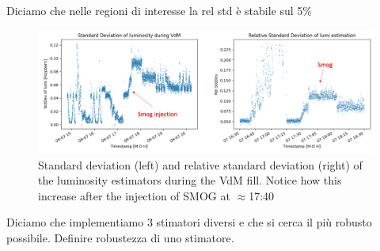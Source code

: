 Diciamo che nelle regioni di interesse la rel std è stabile sul 5\%


\begin{figure}
    \centering
    \includegraphics[width=\textwidth]{figures/std_dev_and_rel_std.png}
    \caption{Standard deviation (left) and relative standard deviation (right) of the luminosity estimators during the VdM fill. Notice how this increase after the injection of SMOG at $\approx$17:40}
    \label{fig:std_dev_rel_std}
\end{figure}


Diciamo che implementiamo 3 stimatori diversi e che si cerca il più robusto possibile. Definire robustezza di uno stimatore. 


